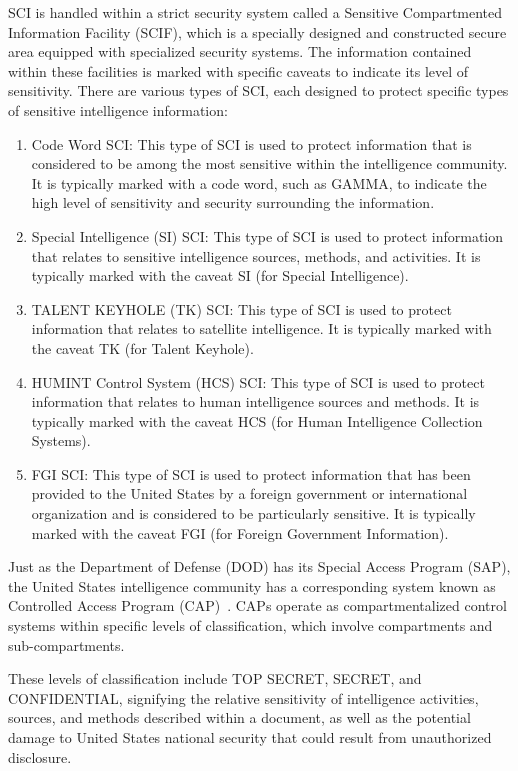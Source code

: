 SCI is handled within a strict security system called a Sensitive Compartmented Information Facility (SCIF), which is a specially designed and constructed secure area equipped with specialized security systems. The information contained within these facilities is marked with specific caveats to indicate its level of sensitivity. There are various types of SCI, each designed to protect specific types of sensitive intelligence information:
\begin{enumerate}
\item
Code Word SCI: This type of SCI is used to protect information that is considered to be among the most sensitive within the intelligence community. It is typically marked with a code word, such as GAMMA, to indicate the high level of sensitivity and security surrounding the information.

\item
Special Intelligence (SI) SCI: This type of SCI is used to protect information that relates to sensitive intelligence sources, methods, and activities. It is typically marked with the caveat SI (for Special Intelligence).

\item
TALENT KEYHOLE (TK) SCI: This type of SCI is used to protect information that relates to satellite intelligence. It is typically marked with the caveat TK (for Talent Keyhole).

\item
HUMINT Control System (HCS) SCI: This type of SCI is used to protect information that relates to human intelligence sources and methods. It is typically marked with the caveat HCS (for Human Intelligence Collection Systems).

\item
FGI SCI: This type of SCI is used to protect information that has been provided to the United States by a foreign government or international organization and is considered to be particularly sensitive. It is typically marked with the caveat FGI (for Foreign Government Information).
\end{enumerate}

Just as the Department of Defense (DOD) has its Special Access Program (SAP),
the United States intelligence community has a corresponding system known as Controlled Access Program (CAP)~\cite{ICD906,CRSCAP22}. CAPs operate as compartmentalized control systems within specific levels of classification, which involve compartments and sub-compartments.

These levels of classification include TOP SECRET, SECRET, and CONFIDENTIAL, signifying the relative sensitivity of intelligence activities, sources, and methods described within a document, as well as the potential damage to United States national security that could result from unauthorized disclosure.

